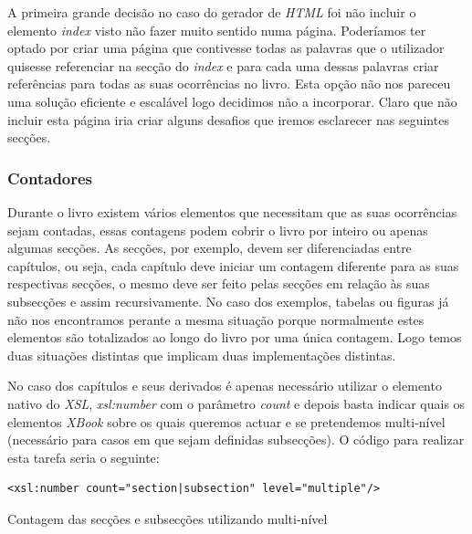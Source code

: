 \documentclass[a4paper]{article}
\begin{document}
\hspace{1cm}A primeira grande decisão no caso do gerador de \emph{HTML} foi não incluir o elemento \emph{index} visto não fazer muito sentido numa página. Poderíamos ter optado por criar uma página que contivesse todas as palavras que o utilizador quisesse referenciar na secção do \emph{index} e para cada uma dessas palavras criar referências para todas as suas ocorrências no livro. Esta opção não nos pareceu uma solução eficiente e escalável logo decidimos não a incorporar. Claro que não incluir esta página iria criar alguns desafios que iremos esclarecer nas seguintes secções.\\
                        
\subsubsection{Contadores}

\hspace{1cm}Durante o livro existem vários elementos que necessitam que as suas ocorrências sejam contadas, essas contagens podem cobrir o livro por inteiro ou apenas algumas secções. As secções, por exemplo, devem ser diferenciadas entre capítulos, ou seja, cada capítulo deve iniciar um contagem diferente para as suas respectivas secções, o mesmo deve ser feito pelas secções em relação às suas subsecções e assim recursivamente. No caso dos exemplos, tabelas ou figuras já não nos encontramos
perante a mesma situação porque normalmente estes elementos são totalizados ao longo do livro por uma única contagem. Logo temos duas situações distintas que implicam duas implementações distintas.

\hspace{1cm}No caso dos capítulos e seus derivados é apenas necessário utilizar o elemento nativo do \emph{XSL}, \emph{xsl:number} com o parâmetro \emph{count} e depois basta indicar quais os elementos \emph{XBook} sobre os quais queremos actuar e se pretendemos multi-nível (necessário para casos em que sejam definidas subsecções). O código para realizar esta tarefa seria o seguinte:\\

\begin{small}                        
\begin{lstlisting}
<xsl:number count="section|subsection" level="multiple"/>
\end{lstlisting}
\end{small}
\begin{footnotesize}
\begin{center}
\caption{Contagem das secções e subsecções utilizando multi-nível}
\end{center}
\end{footnotesize}
\end{document}
